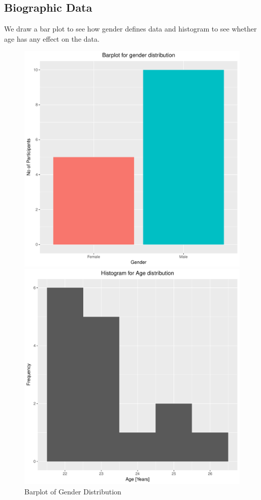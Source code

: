 \documentclass[12pt,epsf]{report}
\begin{document}
\subsection*{Biographic Data}
We draw a bar plot to see how gender defines data and histogram to see whether age has any effect on the data.\\
\begin{figure}[!htb]
	\begin{minipage}[c]{0.5\linewidth}
	\includegraphics[width=\linewidth]{1_gender.pdf}
	\caption{Barplot of Gender Distribution}
	\end{minipage}
	\hfill
	\begin{minipage}[c]{0.5\linewidth}
	\includegraphics[width=\linewidth]{1_age.pdf}

\end{minipage}
\end{figure}
\end{document}
